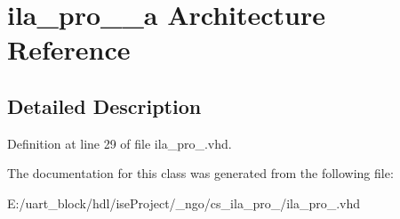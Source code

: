\section{ila\-\_\-pro\-\_\-\_\-a Architecture Reference}
\label{classila__pro__0_1_1ila__pro__0__a}


\subsection{Detailed Description}


Definition at line 29 of file ila\-\_\-pro\-\_.\-vhd.



The documentation for this class was generated from the following file\-:\begin{DoxyCompactItemize}
\item 
E\-:/uart\-\_\-block/hdl/ise\-Project/\-\_\-ngo/cs\-\_\-ila\-\_\-pro\-\_/ila\-\_\-pro\-\_.\-vhd\end{DoxyCompactItemize}
